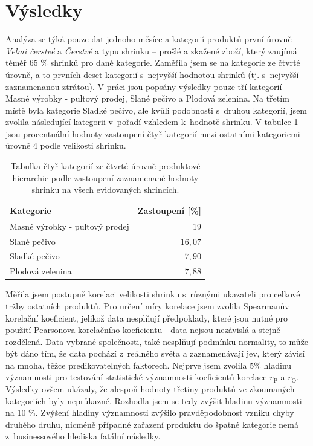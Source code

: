 \section{Výsledky}

Analýza se týká pouze dat jednoho měsíce a kategorií produktů první úrovně \emph{Velmi čerstvé} a \emph{Čerstvé} a typu shrinku -- prošlé a zkažené zboží, který zaujímá téměř 65 \% shrinků pro dané kategorie. Zaměřila jsem se na kategorie ze čtvrté úrovně, a to prvních deset kategorií s~nejvyšší hodnotou shrinků (tj. s~nejvyšší zaznamenanou ztrátou). V práci jsou popsány výsledky pouze tří kategorií -- Masné výrobky - pultový prodej, Slané pečivo a Plodová zelenina. Na třetím místě byla kategorie Sladké pečivo, ale kvůli podobnosti s~druhou kategorií, jsem zvolila následující kategorii v~pořadí vzhledem k~hodnotě shrinku.
V tabulce \ref*{tab:lostcost4} jsou procentuální hodnoty zastoupení čtyř kategorií mezi ostatními kategoriemi úrovně 4 podle velikosti shrinku. %

\begin{table}[hbtp!]
    \centering
    \captionsetup{justification=centering}
    \caption{Tabulka čtyř kategorií ze čtvrté úrovně produktové hierarchie podle zastoupení zaznamenané hodnoty shrinku na všech evidovaných shrincích.}
    \begin{tabular}{l r}
        Kategorie & Zastoupení [\%] \\

    \hline
    Masné výrobky - pultový prodej & 19 \\
    Slané pečivo&  $16{,}07$\\
    Sladké pečivo&   $7{,}90$\\
    Plodová zelenina&   $7{,}88$\\
    \end{tabular}
    \label{tab:lostcost4}
    \end{table}

 Měřila jsem postupně korelaci velikosti shrinku s~různými ukazateli pro celkové tržby ostatních produktů. Pro určení míry korelace jsem zvolila Spearmanův korelační koeficient, jelikož data nesplňují předpoklady, které jsou nutné pro použití Pearsonova korelačního koeficientu - data nejsou nezávislá a stejně rozdělená. Data vybrané společnosti, také nesplňují podmínku normality, to může být dáno tím, že data pochází z~reálného světa a zaznamenávají jev, který závisí na mnoha, těžce predikovatelných faktorech. Nejprve jsem zvolila 5\% hladinu významnosti pro testování statistické významnosti koeficientů korelace $r_\mathrm{P}$ a $r_\mathrm{O}$. Výsledky ovšem ukázaly, že alespoň hodnoty třetiny produktů ve zkoumaných kategoriích  byly neprůkazné. Rozhodla jsem se tedy zvýšit hladinu významnosti na 10 \%. Zvýšení hladiny významnosti zvýšilo pravděpodobnost vzniku chyby druhého druhu, nicméně případné zařazení produktu do špatné kategorie nemá z~businessového hlediska fatální následky.

